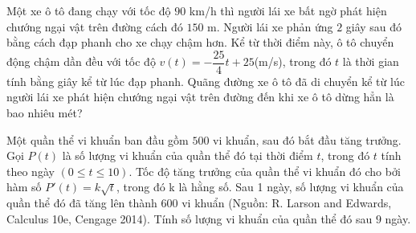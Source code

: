 \begin{ex}%
Một xe ô tô đang chạy với tốc độ $90$ km/h thì người lái xe bất ngờ phát hiện chướng ngại vật trên đường cách đó $150$ m. Người lái xe phản ứng $2$ giây sau đó bằng cách đạp phanh cho xe chạy chậm hơn. Kể từ thời điểm này, ô tô chuyển động chậm dần đều với tốc độ $v(t)=-\dfrac{25}{4}t+25$(m/s), trong đó $t$ là thời gian tính bằng giây kể từ lúc đạp phanh. Quãng đường xe ô tô đã di chuyển kể từ lúc người lái xe phát hiện chướng ngại vật trên đường đến khi xe ô tô dừng hẳn là bao nhiêu mét?\\
\end{ex}

\begin{ex}%
Một quần thể vi khuẩn ban đầu gồm $500$ vi khuẩn, sau đó bắt đầu tăng trưởng. Gọi $P(t)$ là số lượng vi khuẩn của quần thể đó tại thời điểm $t$, trong đó $ t$ tính theo ngày $(0\le t\le 10)$. Tốc độ tăng trưởng của quần thể vi khuẩn đó cho bởi hàm số $P'(t)=k\sqrt{t}$, trong đó k là hằng số. Sau 1 ngày, số lượng vi khuẩn của quần thể đó đã tăng lên thành 600 vi khuẩn (Nguồn: R. Larson and
Edwards, Calculus 10e, Cengage 2014). Tính số lượng vi khuẩn của quần thể đó sau $9$ ngày.

\end{ex}

